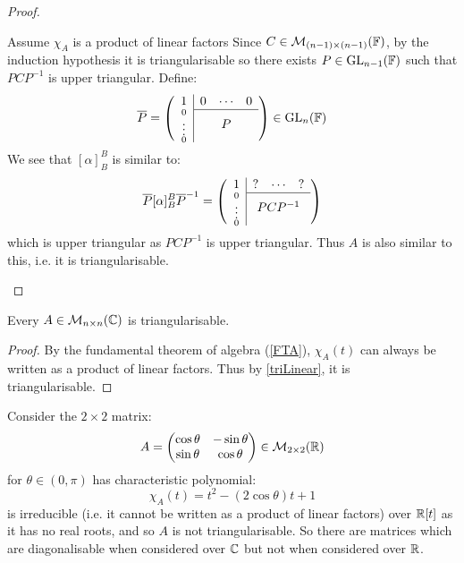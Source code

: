 \documentclass[../main.tex]{subfiles}
\begin{document}
\begin{proof}
\begin{proofdirection}{Assume $\chi_A$ is a product of linear factors}
{      Since $C \in \mathcal{M}_{(n - 1) \times (n - 1)}(\mathbb{F})$, by the induction hypothesis it is triangularisable so there exists $P \in \mathrm{GL}_{n - 1}(\mathbb{F})$ such that $PCP^{-1}$ is upper triangular.
      Define:
      \begin{equation}
        \overline{P} = \left(\begin{array}{c c c c}
        \multicolumn{1}{c|}{1} & 0 & \cdots & 0 \\ \cline{2-4}
        \multicolumn{1}{c|}{\scriptstyle{\substack{0 \\ \vdots \\ 0}}} & \multicolumn{3}{c}{P} \\
        \end{array}\right) \in \GL_n(\F) \label{blockCOB}
      \end{equation}
      We see that $[\alpha]^{B}_{B}$ is similar to:
      \[
        \overline{P} [\alpha]^{B}_{B} \overline{P}^{-1} = \left(\begin{array}{c c c c}
        \multicolumn{1}{c|}{1} & ? & \cdots & ? \\ \cline{2-4}
        \multicolumn{1}{c|}{\scriptstyle{\substack{0 \\ \vdots \\ 0}}} & \multicolumn{3}{c}{PCP^{-1}} \\
        \end{array}\right)
      \]
      which is upper triangular as $PCP^{-1}$ is upper triangular.
      Thus $A$ is also similar to this, i.e. it is triangularisable.
    }
  \end{proofdirection}
\end{proof}
\begin{theorem}
  Every $A \in \mathcal{M}_{n \times n}(\mathbb{C})$ is triangularisable. \label{CTri}
\end{theorem}
\begin{proof}
  By the fundamental theorem of algebra (\cref{FTA}), $\chi_{A}(t)$ can always be written as a product of linear factors.
  Thus by \cref{triLinear}, it is triangularisable.
\end{proof}
\begin{example}
  Consider the $2 \times 2$ matrix:
  \[
    A = \begin{pmatrix}
    \cos \theta & -\sin \theta \\
    \sin \theta & \cos \theta \\
    \end{pmatrix} \in \mathcal{M}_{2 \times 2}(\mathbb{R})
  \]
  for $\theta \in (0, \pi)$ has characteristic polynomial:
  \[
    \chi_A(t) = t^2 - (2 \cos \theta) t + 1
  \]
  is irreducible (i.e. it cannot be written as a product of linear factors) over $\mathbb{R}[t]$ as it has no real roots, and so $A$ is not triangularisable.
  So there are matrices which are diagonalisable when considered over $\mathbb{C}$ but not when considered over $\mathbb{R}$.
\end{example}
\end{document}
